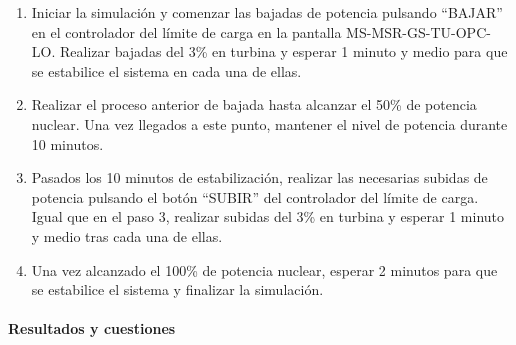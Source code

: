\begin{enumerate}
  \item Iniciar la simulación y comenzar las bajadas de potencia pulsando ``BAJAR'' en el controlador del límite de carga en la pantalla MS-MSR-GS-TU-OPC-LO. Realizar bajadas del 3\% en turbina y esperar 1 minuto y medio para que se estabilice el sistema en cada una de ellas. 
  \item Realizar el proceso anterior de bajada hasta alcanzar el 50\% de potencia nuclear. Una vez llegados a este punto, mantener el nivel de potencia durante 10 minutos.
  \item Pasados los 10 minutos de estabilización, realizar las necesarias subidas de potencia pulsando el botón ``SUBIR'' del controlador del límite de carga. Igual que en el paso 3, realizar subidas del 3\% en turbina y esperar 1 minuto y medio tras cada una de ellas.
  \item Una vez alcanzado el 100\% de potencia nuclear, esperar 2 minutos para que se estabilice el sistema y finalizar la simulación.
\end{enumerate}  

\paragraph{Resultados y cuestiones}

